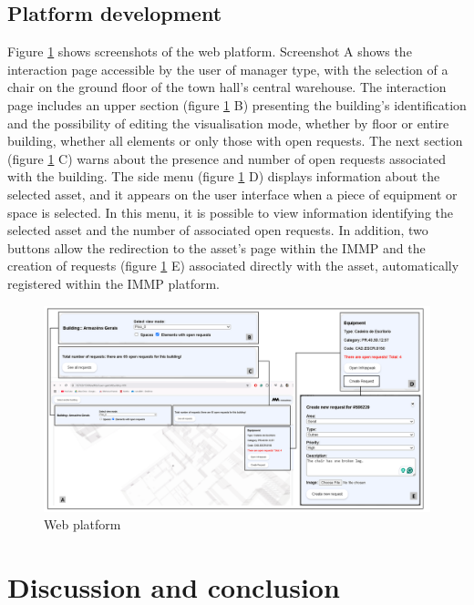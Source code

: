 \documentclass[a4paper, 10pt, twocolumn, twoside]{article}
\begin{document}
\subsection{Platform development}
\label{subsec:platform}

Figure \ref{fig_plataforma} shows screenshots of the web platform. Screenshot A shows the interaction page accessible by the user of manager type, with the selection of a chair on the ground floor of the town hall's central warehouse. The interaction page includes an upper section (figure \ref{fig_plataforma} B) presenting the building's identification and the possibility of editing the visualisation mode, whether by floor or entire building, whether all elements or only those with open requests. The next section (figure \ref{fig_plataforma} C) warns about the presence and number of open requests associated with the building. The side menu (figure \ref{fig_plataforma} D) displays information about the selected asset, and it appears on the user interface when a piece of equipment or space is selected. In this menu, it is possible to view information identifying the selected asset and the number of associated open requests. In addition, two buttons allow the redirection to the asset's page within the IMMP and the creation of requests (figure \ref{fig_plataforma} E) associated directly with the asset, automatically registered within the IMMP platform.

\begin{figure}[!htb]
    \centering
    \includegraphics[width=\textwidth]{Images/plataforma.png}
    \caption{Web platform}
    \label{fig_plataforma}
\end{figure}

\section{Discussion and conclusion}
\label{sec:conclusion}
\end{document}
